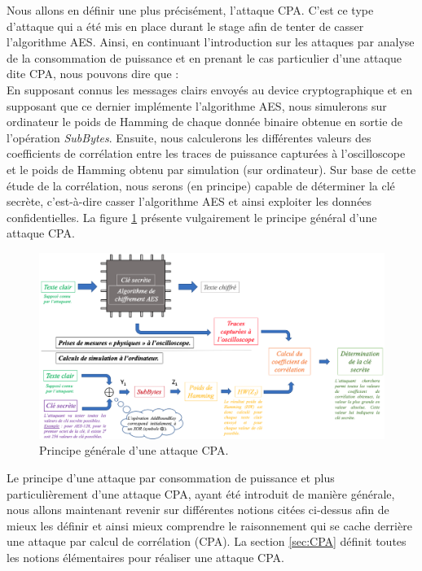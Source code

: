 \documentclass[10pt, oneside, a4paper]{article}
\begin{document}
\hspace{-0.5 cm}Nous allons en définir une plus précisément, l'attaque CPA. C'est ce type d'attaque qui a été mis en place durant le stage afin de tenter de casser l'algorithme AES. Ainsi, en continuant l'introduction sur les attaques par analyse de la consommation de puissance et en prenant le cas particulier d'une attaque dite CPA, nous pouvons dire que : \\ En supposant connus les messages clairs envoyés au device cryptographique et en supposant que ce dernier implémente l'algorithme AES, nous simulerons sur ordinateur le poids de Hamming de chaque donnée binaire obtenue en sortie de l'opération \textit{SubBytes}. Ensuite, nous calculerons les différentes valeurs des coefficients de corrélation entre les traces de puissance capturées à l'oscilloscope et le poids de Hamming obtenu par simulation (sur ordinateur). Sur base de cette étude de la corrélation, nous serons (en principe) capable de déterminer la clé secrète, c'est-à-dire casser l'algorithme AES et ainsi exploiter les données confidentielles. La figure \ref{fig:CPA} présente vulgairement le principe général d'une attaque CPA.
\begin{figure}[h]
    \hspace{-1.5 cm}
    \includegraphics[scale=0.35]{image/CPA}
    \caption{Principe générale d'une attaque CPA.}
    \label{fig:CPA} 
\end{figure}

\vspace{-0.3 cm}Le principe d'une attaque par consommation de puissance et plus particulièrement d'une attaque CPA, ayant été introduit de manière générale, nous allons maintenant revenir sur différentes notions citées ci-dessus afin de mieux les définir et ainsi mieux comprendre le raisonnement qui se cache derrière une attaque par calcul de corrélation (CPA). La section \ref{sec:CPA} définit toutes les notions élémentaires pour réaliser une attaque CPA.
\end{document}
